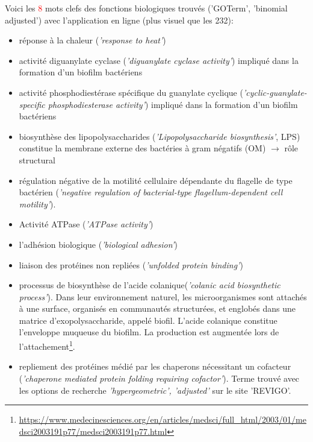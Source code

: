 \documentclass[a4paper,11pt,openright]{report}
\begin{document}
Voici les \textcolor{red}{8} mots clefs des fonctions biologiques trouvés ('GOTerm', 'binomial adjusted') avec l'application en ligne (plus visuel que les 232): 
\begin{itemize}[label=\textbullet]
	\item réponse à la chaleur (\textit{'response to heat'}) 
	\item activité diguanylate cyclase (\textit{'diguanylate cyclase activity'}) impliqué dans la formation d'un biofilm bactériens
	\item activité phosphodiestérase spécifique du guanylate cyclique (\textit{'cyclic-guanylate-specific phosphodiesterase activity'}) impliqué dans la formation d'un biofilm bactériens
	\item biosynthèse des lipopolysaccharides (\textit{'Lipopolysaccharide biosynthesis'}, LPS) constitue la membrane externe des bactéries à gram négatifs (OM) $\rightarrow$  rôle structural
	\item régulation négative de la motilité cellulaire dépendante du flagelle de type bactérien (\textit{'negative regulation of bacterial-type flagellum-dependent cell motility'}). 
	\item Activité ATPase (\textit{'ATPase activity'})
	\item l'adhésion biologique (\textit{'biological adhesion'}) 
	\item liaison des protéines non repliées (\textit{'unfolded protein binding'})
	\item processus de biosynthèse de l'acide colanique(\textit{'colanic acid biosynthetic process'}). Dans leur environnement naturel, les microorganismes sont attachés à une surface, organisés en communautés structurées, et englobés dans une matrice d’exopolysaccharide, appelé biofil.  L'acide colanique constitue l'enveloppe muqueuse du biofilm. La production est augmentée lors de l'attachement\footnote{\url{https://www.medecinesciences.org/en/articles/medsci/full_html/2003/01/medsci2003191p77/medsci2003191p77.html}}.
	\item repliement des protéines médié par les chaperons nécessitant un cofacteur (\textit{'chaperone mediated protein folding requiring cofactor'}). Terme trouvé avec les options de recherche \textit{'hypergeometric', 'adjusted'} sur le site 'REVIGO'.
	\end{itemize}
\end{document}
